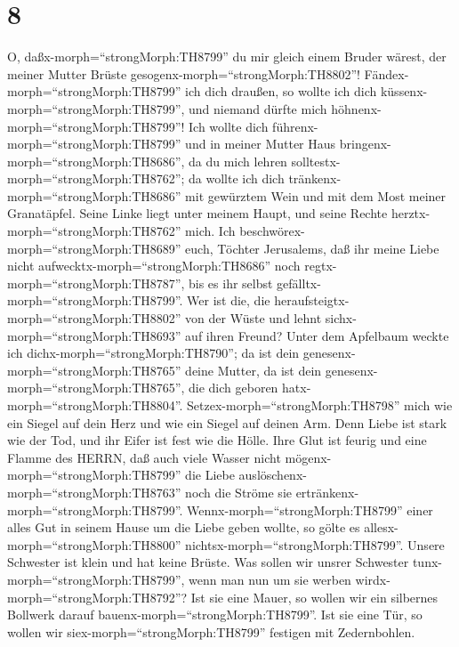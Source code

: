 \hypertarget{section-7}{%
\section{8}\label{section-7}}

 O, daßx-morph=``strongMorph:TH8799'' du mir gleich einem
Bruder wärest, der meiner Mutter Brüste
gesogenx-morph=``strongMorph:TH8802''!
Fändex-morph=``strongMorph:TH8799'' ich dich draußen, so wollte ich dich
küssenx-morph=``strongMorph:TH8799'', und niemand dürfte mich
höhnenx-morph=``strongMorph:TH8799''!  Ich wollte dich
führenx-morph=``strongMorph:TH8799'' und in meiner Mutter Haus
bringenx-morph=``strongMorph:TH8686'', da du mich lehren
solltestx-morph=``strongMorph:TH8762''; da wollte ich dich
tränkenx-morph=``strongMorph:TH8686'' mit gewürztem Wein und mit dem
Most meiner Granatäpfel.  Seine Linke liegt unter meinem
Haupt, und seine Rechte herztx-morph=``strongMorph:TH8762'' mich.
 Ich beschwörex-morph=``strongMorph:TH8689'' euch, Töchter
Jerusalems, daß ihr meine Liebe nicht
aufwecktx-morph=``strongMorph:TH8686'' noch
regtx-morph=``strongMorph:TH8787'', bis es ihr selbst
gefälltx-morph=``strongMorph:TH8799''.  Wer ist die, die
heraufsteigtx-morph=``strongMorph:TH8802'' von der Wüste und lehnt
sichx-morph=``strongMorph:TH8693'' auf ihren Freund? Unter dem Apfelbaum
weckte ich dichx-morph=``strongMorph:TH8790''; da ist dein
genesenx-morph=``strongMorph:TH8765'' deine Mutter, da ist dein
genesenx-morph=``strongMorph:TH8765'', die dich geboren
hatx-morph=``strongMorph:TH8804''. 
Setzex-morph=``strongMorph:TH8798'' mich wie ein Siegel auf dein Herz
und wie ein Siegel auf deinen Arm. Denn Liebe ist stark wie der Tod, und
ihr Eifer ist fest wie die Hölle. Ihre Glut ist feurig und eine Flamme
des HERRN,  daß auch viele Wasser nicht
mögenx-morph=``strongMorph:TH8799'' die Liebe
auslöschenx-morph=``strongMorph:TH8763'' noch die Ströme sie
ertränkenx-morph=``strongMorph:TH8799''.
Wennx-morph=``strongMorph:TH8799'' einer alles Gut in seinem Hause um
die Liebe geben wollte, so gölte es allesx-morph=``strongMorph:TH8800''
nichtsx-morph=``strongMorph:TH8799''.  Unsere Schwester ist
klein und hat keine Brüste. Was sollen wir unsrer Schwester
tunx-morph=``strongMorph:TH8799'', wenn man nun um sie werben
wirdx-morph=``strongMorph:TH8792''?  Ist sie eine Mauer, so
wollen wir ein silbernes Bollwerk darauf
bauenx-morph=``strongMorph:TH8799''. Ist sie eine Tür, so wollen wir
siex-morph=``strongMorph:TH8799'' festigen mit Zedernbohlen.
